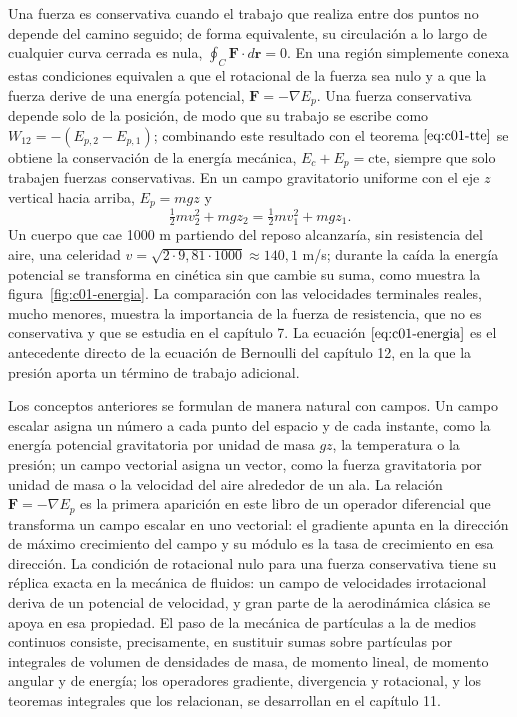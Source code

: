 \documentclass[10pt,openany]{book}
\begin{document}
Una fuerza es conservativa cuando el trabajo que realiza entre dos puntos no depende del camino seguido; de forma equivalente, su circulación a lo largo de cualquier curva cerrada es nula, \(\oint_C \mathbf{F}\cdot d\mathbf{r} = 0\). En una región simplemente conexa estas condiciones equivalen a que el rotacional de la fuerza sea nulo y a que la fuerza derive de una energía potencial, \(\mathbf{F} = -\nabla E_p\). Una fuerza conservativa depende solo de la posición, de modo que su trabajo se escribe como \(W_{12} = -(E_{p,2} - E_{p,1})\); combinando este resultado con el teorema \(\eqref{eq:c01-tte}\) se obtiene la conservación de la energía mecánica, \(E_c + E_p = \text{cte}\), siempre que solo trabajen fuerzas conservativas. En un campo gravitatorio uniforme con el eje \(z\) vertical hacia arriba, \(E_p = m g z\) y
\begin{equation}
\tfrac{1}{2}m v_2^{2} + m g z_2 = \tfrac{1}{2}m v_1^{2} + m g z_1. \label{eq:c01-energia}
\end{equation}
Un cuerpo que cae 1000 m partiendo del reposo alcanzaría, sin resistencia del aire, una celeridad \(v = \sqrt{2\cdot 9{,}81\cdot 1000} \approx 140{,}1\) m/s; durante la caída la energía potencial se transforma en cinética sin que cambie su suma, como muestra la figura~\ref{fig:c01-energia}. La comparación con las velocidades terminales reales, mucho menores, muestra la importancia de la fuerza de resistencia, que no es conservativa y que se estudia en el capítulo 7. La ecuación \(\eqref{eq:c01-energia}\) es el antecedente directo de la ecuación de Bernoulli del capítulo 12, en la que la presión aporta un término de trabajo adicional.

Los conceptos anteriores se formulan de manera natural con campos. Un campo escalar asigna un número a cada punto del espacio y de cada instante, como la energía potencial gravitatoria por unidad de masa \(g z\), la temperatura o la presión; un campo vectorial asigna un vector, como la fuerza gravitatoria por unidad de masa o la velocidad del aire alrededor de un ala. La relación \(\mathbf{F} = -\nabla E_p\) es la primera aparición en este libro de un operador diferencial que transforma un campo escalar en uno vectorial: el gradiente apunta en la dirección de máximo crecimiento del campo y su módulo es la tasa de crecimiento en esa dirección. La condición de rotacional nulo para una fuerza conservativa tiene su réplica exacta en la mecánica de fluidos: un campo de velocidades irrotacional deriva de un potencial de velocidad, y gran parte de la aerodinámica clásica se apoya en esa propiedad. El paso de la mecánica de partículas a la de medios continuos consiste, precisamente, en sustituir sumas sobre partículas por integrales de volumen de densidades de masa, de momento lineal, de momento angular y de energía; los operadores gradiente, divergencia y rotacional, y los teoremas integrales que los relacionan, se desarrollan en el capítulo 11.
\end{document}
